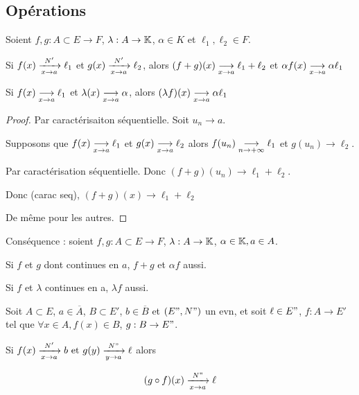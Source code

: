 \subsection{Opérations}

\begin{theoreme}{}{}
    Soient $f, g : A \subset E \to F$, $\lambda : A \to \K$, $\alpha \in K$ et $\ell_1, \ell_2 \in F$. 

    Si $f(x) \limitnorme{N'}{x}{a} \ell_1$ et $g(x) \limitnorme{N'}{x}{a} \ell_2$, alors
    $(f + g)(x) \limit x a \ell_1 + \ell_2$ et $\alpha f(x) \limit x a \alpha \ell_1$

    Si $f(x) \limit x a \ell_1$ et $\lambda(x) \limit x a \alpha$, alors $(\lambda f)(x) \limit x a \alpha \ell_1$
\end{theoreme}


\begin{proof}
    Par caractérisaiton séquentielle. Soit $u_n \longrightarrow a$. 

    Supposons que $f(x) \limit x a \ell_1$ et $g(x) \limit x a \ell_2$ alors 
    $f(u_n) \limit n {+ \infty} \ell_1$ et $g(u_n) \longrightarrow \ell_2$. 

    Par caractérisation séquentielle. Donc $(f + g)(u_n) \longrightarrow \ell_1 + \ell_2$. 

    Donc (carac seq), $(f + g)(x) \longrightarrow \ell_1 + \ell_2$

    De même pour les autres. 
\end{proof}

Conséquence : soient $f, g : A \subset E \to F$, $\lambda : A \to \K$, $\alpha \in \K, a \in A$. 

Si $f$ et $g$ dont continues en $a$, $f + g$ et $\alpha f$ aussi. 

Si $f$ et $\lambda$ continues en a, $\lambda f$ aussi. 

\begin{proposition}{}{}
    Soit $A \subset E$, $a \in \overline A$, $B \subset E'$, $b \in \overline B$ et 
    $(E", N")$ un evn, et soit $\ell \in E"$, $f : A \to E'$ tel que $\forall x \in A, f(x) \in B$, $g: B \to E"$. 

    Si $f(x) \limitnorme{N'}x a b \text{ et } g(y) \limitnorme{N"}y a \ell$ alors 

    $$(g \circ f )(x) \limitnorme{N"} x a \ell$$
\end{proposition}

